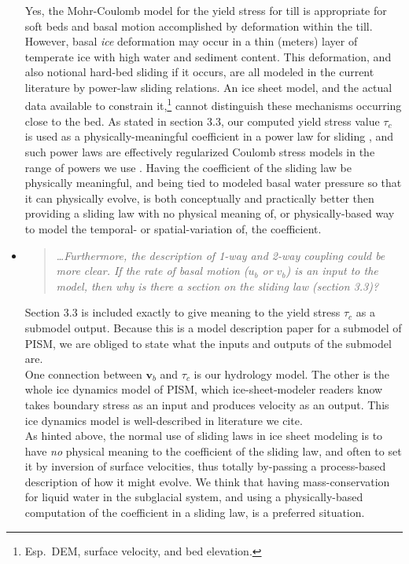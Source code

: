 \documentclass[11pt,reqno]{amsart}
\newcommand{\reply}[2]{
\medskip\medskip
\item  \begin{quote}
\emph{#1}
\end{quote}

\medskip
\noindent #2}
\begin{document}
\begin{itemize}
{\indent Yes, the Mohr-Coulomb model for the yield stress for till is appropriate for soft beds and basal motion accomplished by deformation within the till.  However, basal \emph{ice} deformation may occur in a thin (meters) layer of temperate ice with high water and sediment content. This deformation, and also notional hard-bed sliding if it occurs, are all modeled in the current literature by power-law sliding relations.  An ice sheet model, and the actual data available to constrain it,\footnote{Esp.~DEM, surface velocity, and bed elevation.} cannot distinguish these mechanisms occurring close to the bed.  As stated in section 3.3, our computed yield stress value $\tau_c$ is used as a physically-meaningful coefficient in a power law for sliding \cite{AschwandenAdalgeirsdottirKhroulev}, and such power laws are effectively regularized Coulomb stress models in the range of powers we use \cite{SchoofCoulombBlatter}.  Having the coefficient of the sliding law be physically meaningful, and being tied to modeled basal water pressure so that it can physically evolve, is both conceptually and practically better then providing a sliding law with no physical meaning of, or physically-based way to model the temporal- or spatial-variation of, the coefficient.}

\reply{\dots  Furthermore, the description of 1-way and 2-way coupling could be more clear. If the rate of basal motion ($u_b$ or $v_b$) is an input to the model, then why is there a section on the sliding law (section 3.3)?}
{Section 3.3 is included exactly to give meaning to the yield stress $\tau_c$ as a submodel output.  Because this is a model description paper for a submodel of PISM, we are obliged to state what the inputs and outputs of the submodel are.\\
\indent One connection between $\mathbf{v}_b$ and $\tau_c$ is our hydrology model.  The other is the whole ice dynamics model of PISM, which ice-sheet-modeler readers know takes boundary stress as an input and produces velocity as an output.  This ice dynamics model is well-described in literature we cite. \\
\indent As hinted above, the normal use of sliding laws in ice sheet modeling is to have \emph{no} physical meaning to the coefficient of the sliding law, and often to set it by inversion of surface velocities, thus totally by-passing a process-based description of how it might evolve.  We think that having mass-conservation for liquid water in the subglacial system, and using a physically-based computation of the coefficient in a sliding law, is a preferred situation.}


\end{itemize}
\end{document}

